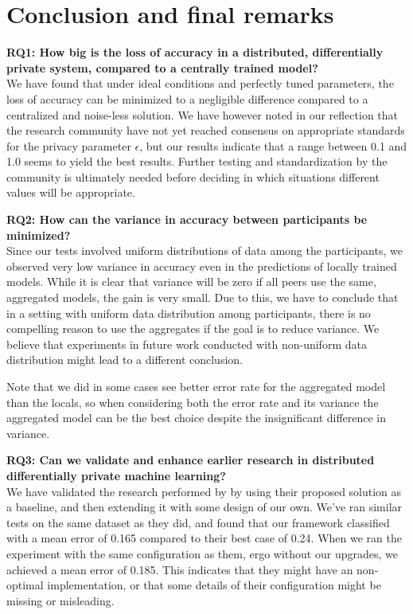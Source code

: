 \section{Conclusion and final remarks}
\textbf{RQ1: How big is the loss of accuracy in a distributed, differentially private system, compared to a centrally trained model?} \\
We have found that under ideal conditions and perfectly tuned parameters, the loss of accuracy can be minimized to a negligible difference compared to a centralized and noise-less solution. We have however noted in our reflection that the research community have not yet reached consensus on appropriate standards for the privacy parameter $\epsilon$, but our results indicate that a range between 0.1 and 1.0 seems to yield the best results. Further testing and standardization by the community is ultimately needed before deciding in which situations different values will be appropriate.

\vspace{2mm}
\noindent
\textbf{RQ2: How can the variance in accuracy between participants be minimized?} \\
Since our tests involved uniform distributions of data among the participants, we observed very low variance in accuracy even in the predictions of locally trained models. While it is clear that variance will be zero if all peers use the same, aggregated models, the gain is very small. Due to this, we have to conclude that in a setting with uniform data distribution among participants, there is no compelling reason to use the aggregates if the goal is to reduce variance. We believe that experiments in future work conducted with non-uniform data distribution might lead to a different conclusion.

Note that we did in some cases see better error rate for the aggregated model than the locals, so when considering both the error rate and its variance the aggregated model can be the best choice despite the insignificant difference in variance.

\vspace{2mm}
\noindent
\textbf{RQ3: Can we validate and enhance earlier research in distributed differentially private machine learning?} \\
We have validated the research performed by \cite{pathak2010diffprivhomo} by using their proposed solution as a baseline, and then extending it with some design of our own. We've ran similar tests on the same dataset as they did, and found that our framework classified with a mean error of 0.165 compared to their best case of 0.24. When we ran the experiment with the same configuration as them, ergo without our upgrades, we achieved a mean error of 0.185. This indicates that they might have an non-optimal implementation, or that some details of their configuration might be missing or misleading. 

